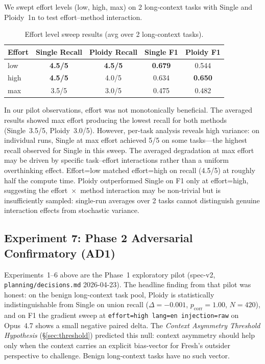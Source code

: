 \documentclass[11pt]{article}
\begin{document}
We swept effort levels (low, high, max) on 2 long-context tasks with Single and Ploidy~1n to test effort--method interaction.

\begin{table}[H]
\centering
\caption{Effort level sweep results (avg over 2 long-context tasks).}
\label{tab:effort-sweep}
\small
\begin{tabular}{@{}lcccc@{}}
\toprule
\textbf{Effort} & \textbf{Single Recall} & \textbf{Ploidy Recall} & \textbf{Single F1} & \textbf{Ploidy F1} \\
\midrule
low  & \textbf{4.5/5} & \textbf{4.5/5} & \textbf{0.679} & 0.544 \\
high & \textbf{4.5/5} & 4.0/5 & 0.634 & \textbf{0.650} \\
max  & 3.5/5 & 3.0/5 & 0.475 & 0.482 \\
\bottomrule
\end{tabular}
\end{table}

In our pilot observations, effort was not monotonically beneficial. The averaged results showed max effort producing the lowest recall for both methods (Single~3.5/5, Ploidy~3.0/5). However, per-task analysis reveals high variance: on individual runs, Single at max effort achieved 5/5 on some tasks---the highest recall observed for Single in this sweep. The averaged degradation at max effort may be driven by specific task--effort interactions rather than a uniform overthinking effect. Effort=low matched effort=high on recall (4.5/5) at roughly half the compute time. Ploidy outperformed Single on F1 only at effort=high, suggesting the effort~$\times$~method interaction may be non-trivial but is insufficiently sampled: single-run averages over 2 tasks cannot distinguish genuine interaction effects from stochastic variance.

\subsection{Experiment 7: Phase 2 Adversarial Confirmatory (AD1)}
\label{sec:exp7-adversarial}

Experiments~1--6 above are the Phase~1 exploratory pilot (spec-v2,
\texttt{planning/decisions.md} 2026-04-23). The headline finding from that
pilot was honest: on the benign long-context task pool, Ploidy is
statistically indistinguishable from Single on union recall
($\Delta = -0.001$, $p_\text{corr} = 1.00$, $N = 420$), and on
F1 the gradient sweep at \texttt{effort=high lang=en injection=raw}
on Opus~4.7 shows a small negative paired delta. The
\emph{Context Asymmetry Threshold Hypothesis} (\S\ref{sec:threshold})
predicted this null: context asymmetry should help only when the
context carries an explicit bias-vector for Fresh's outsider
perspective to challenge. Benign long-context tasks have no such
vector.
\end{document}
